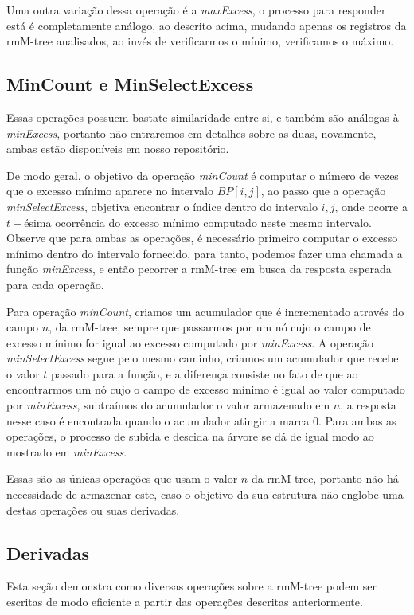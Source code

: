         
        Uma outra variação dessa operação é a \textit{maxExcess}, o processo para responder está é completamente análogo, ao descrito acima, mudando apenas os registros da rmM-tree analisados, 
        ao invés de verificarmos o mínimo, verificamos o máximo.

    \subsection{MinCount e MinSelectExcess}
    Essas operações possuem bastate similaridade entre si, e também são análogas à \textit{minExcess}, portanto não entraremos em  detalhes sobre as duas, novamente, ambas 
    estão disponíveis em nosso repositório. 
    

    De modo geral, o objetivo da operação \textit{minCount} é computar o número de vezes que o excesso mínimo aparece no intervalo $BP[i,j]$, ao passo que a operação \textit{minSelectExcess}, 
    objetiva encontrar o índice dentro do intervalo $i,j$, onde ocorre a $t-$ésima ocorrência do excesso mínimo computado neste mesmo intervalo. 
    Observe que para ambas as operações, é necessário primeiro computar o excesso mínimo dentro do intervalo fornecido, para tanto, podemos fazer uma chamada a função \textit{minExcess}, 
    e então pecorrer a rmM-tree em busca da resposta esperada para cada operação. 
    
    Para operação \textit{minCount}, criamos um acumulador que é incrementado através do campo $n$, da rmM-tree, sempre que passarmos por um nó cujo o campo de excesso mínimo for igual ao excesso computado
    por \textit{minExcess}. 
    A operação \textit{minSelectExcess} segue pelo mesmo caminho, criamos um acumulador que recebe o valor $t$ passado para a função, e a diferença consiste no fato de que 
    ao encontrarmos um nó cujo o campo de excesso mínimo é igual ao valor computado por \textit{minExcess}, subtraímos do acumulador  o valor armazenado em $n$,
    a resposta nesse caso é encontrada quando o acumulador atingir a marca $0$. Para ambas as operações, o processo de subida e 
    descida na árvore se dá de igual modo ao mostrado em \textit{minExcess}.


    Essas são as únicas operações que usam o valor $n$ da rmM-tree, portanto não há necessidade de armazenar este, caso o objetivo da sua estrutura não englobe uma destas operações ou
    suas derivadas.

    \subsection{Derivadas}
    Esta seção demonstra como diversas operações sobre a rmM-tree podem ser escritas de modo eficiente a partir das operações descritas anteriormente.

